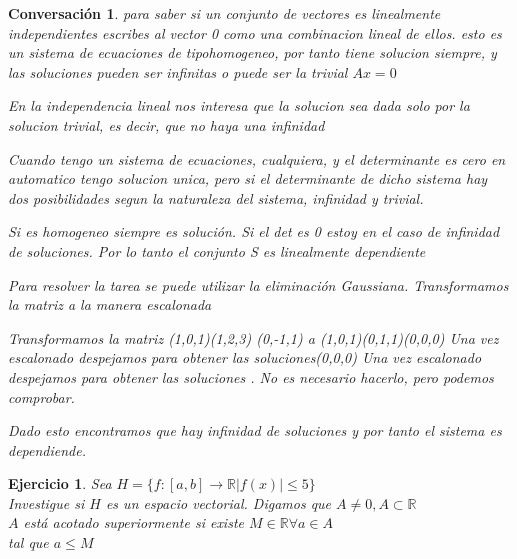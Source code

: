 \documentclass{IEEEtran}
\newcommand{\mb}[1]{\mathbb{#1}}
\newtheorem{conv}{Conversaci\'{o}n}
\newtheorem{ejer}{Ejercicio}
\begin{document}
\begin{conv}
	para saber si un conjunto de vectores es linealmente independientes escribes al vector 0 como una combinacion lineal de ellos. esto es un sistema de ecuaciones de tipohomogeneo, por tanto tiene solucion siempre, y las soluciones pueden ser infinitas o puede ser la trivial $Ax=0$

En la independencia lineal nos interesa que la solucion sea dada solo por la solucion trivial, es decir, que no haya una infinidad

Cuando tengo un sistema de ecuaciones, cualquiera, y el determinante es cero en automatico tengo solucion unica, pero si el determinante de dicho sistema hay dos posibilidades segun la naturaleza del sistema, infinidad y trivial.

Si es homogeneo siempre es soluci\'{o}n. Si el det es 0 estoy en el caso de infinidad de soluciones. Por lo tanto el conjunto S es linealmente dependiente

Para resolver la tarea se puede utilizar la eliminaci\'{o}n Gaussiana. Transformamos la matriz a la manera escalonada
 
Transformamos la matriz (1,0,1)(1,2,3) (0,-1,1) a (1,0,1)(0,1,1)(0,0,0) Una vez escalonado despejamos para obtener las soluciones(0,0,0) Una vez escalonado despejamos para obtener las soluciones . No es necesario hacerlo, pero podemos comprobar. 

Dado esto encontramos que hay infinidad de soluciones y por tanto el sistema es dependiende.
\end{conv}
\begin{ejer}
	Sea $H=\{ f:[a,b]\to\mb{R}|f(x)|\leq 5\}$\\
	Investigue si $H$ es un espacio vectorial.
	Digamos que $A \neq 0, A \subset \mb{R}$\\
	$A$ est\'{a} acotado superiormente si existe $M \in  \mb{R} \forall a\in A$\\
tal que $a \leq M$	

\end{ejer}
\end{document}
